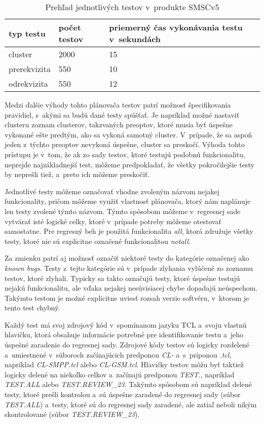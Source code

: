 \begin{table}
  \begin{center}
    \begin{tabular}{| l | l | l |}
    \hline
    typ testu & počet testov & priemerný čas vykonávania testu v~sekundách \\ \hline
    cluster & 2000 & 15 \\ \hline
    prerekvizita & 550 & 10 \\ \hline
    odrekvizita & 550 & 12 \\
    \hline
    \end{tabular}
    \label{table:tabulka_pomer_smsc}
    \caption{Prehľad jednotlivých testov v~produkte SMSCv5}
  \end{center}
\end{table}

Medzi ďalšie výhody tohto plánovača testov patrí možnosť špecifikovania pravidiel, s~akými sa budú dané testy spúšťať.
Je napríklad možné nastaviť clusteru zoznam clusterov, takzvaných preoptov, ktoré musia byť úspešne vykonané ešte predtým, ako sa vykoná samotný
cluster. V~prípade, že sa aspoň jeden z~týchto preoptov nevykoná úspešne, cluster sa preskočí.
Výhoda tohto prístupu je v~tom, že ak zo sady testov, ktoré testujú podobnú funkcionalitu, neprejde najzákladnejší test,
môžeme predpokladať, že všetky pokročilejšie testy by neprešli tiež, a~preto ich môžeme preskočiť.

Jednotlivé testy môžeme označovať vhodne zvoleným názvom nejakej funkcionality, pričom môžeme využiť vlastnosť 
plánovača, ktorý nám naplánuje len testy zvolené týmto názvom. Týmto spôsobom môžeme v~regresnej sade vytvárať isté logické celky,
ktoré v~prípade potreby môžeme otestovať samostatne. Pre regresný beh je použitá funkcionalita {\it all}, ktorá združuje 
všetky testy, ktoré nie sú explicitne označené funkcionalitou {\it notall}. 

Za zmienku patrí aj možnosť označiť niektoré testy do kategórie označenej ako {\it known bugs}.
Testy z~tejto kategórie sú v~prípade zlyhania vylúčené zo zoznamu testov, ktoré zlyhali.
Typicky sa takto označujú testy, ktoré úspešne testujú nejakú funkcionalitu, ale vďaka nejakej nesúvisiacej chybe 
dopadajú neúspechom. Takýmto testom je možné explicitne uviesť rozsah verzie softvéru, v~ktorom je tento test chybný.

Každý test má svoj zdrojový kód v~spomínanom jazyku TCL a~svoju vlastnú hlavičku, ktorá obsahuje informácie potrebné pre identifikovanie testu a~jeho úspešné zaradenie do regresnej sady.
Zdrojové kódy testov sú logicky rozdelené a~umiestnené v~súboroch začínajúcich predponou {\it CL-} a~s~príponou {\it .tcl}, napríklad {\it CL-SMPP.tcl} alebo {\it CL-GSM.tcl}.
Hlavičky testov môžu byť taktiež logicky delené na niekoľko celkov a~začínajú predponou {\it TEST.}, napríklad {\it TEST.ALL} alebo {\it TEST.REVIEW\_23}.
Takýmto spôsobom sú napríklad delené testy, ktoré prešli kontrolou a~sú úspešne zaradené do regresnej sady (súbor {\it TEST.ALL}) a~testy, ktoré sú do regresnej sady zaradené, ale
zatiaľ neboli nikým skontrolované (súbor {\it TEST.REVIEW\_23}).

